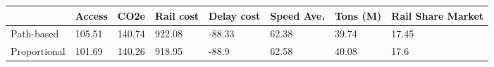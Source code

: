 \begin{tabular}{llllllll}
& Access & CO2e & Rail cost & Delay cost & Speed Ave. & Tons (M) & Rail Share Market \\ 
\hline 
Path-based & 105.51 & 140.74 & 922.08 & -88.33 & 62.38 & 39.74 & 17.45 \\ 
Proportional & 101.69 & 140.26 & 918.95 & -88.9 & 62.58 & 40.08 & 17.6 \\ 
\hline 
\end{tabular}